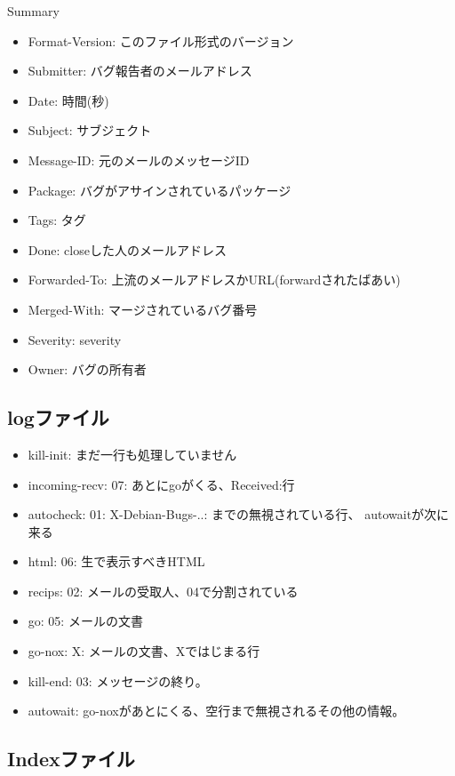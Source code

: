\documentclass[cjk,dvipdfmx]{beamer}
\begin{document}
\begin{frame}
 Summary
 \begin{itemize}
 \item Format-Version: このファイル形式のバージョン
 \item Submitter: バグ報告者のメールアドレス
 \item Date: 時間(秒)
 \item Subject: サブジェクト
 \item Message-ID: 元のメールのメッセージID
 \item Package: バグがアサインされているパッケージ
 \item Tags: タグ
 \item Done: closeした人のメールアドレス
 \item Forwarded-To: 上流のメールアドレスかURL(forwardされたばあい)
 \item Merged-With: マージされているバグ番号
 \item Severity: severity
 \item Owner: バグの所有者
 \end{itemize}
\end{frame}

\subsection{logファイル}

\begin{frame}
 \begin{itemize}
 \item kill-init: まだ一行も処理していません
 \item incoming-recv: 07: あとにgoがくる、Received:行
 \item autocheck: 01: X-Debian-Bugs-..: までの無視されている行、
       autowaitが次に来る
 \item html: 06: 生で表示すべきHTML
 \item recips: 02: メールの受取人、04で分割されている
 \item go: 05: メールの文書
 \item go-nox: X: メールの文書、Xではじまる行
 \item kill-end: 03: メッセージの終り。
 \item autowait: go-noxがあとにくる、空行まで無視されるその他の情報。
 \end{itemize}
\end{frame}

\subsection{Indexファイル}
\end{document}
